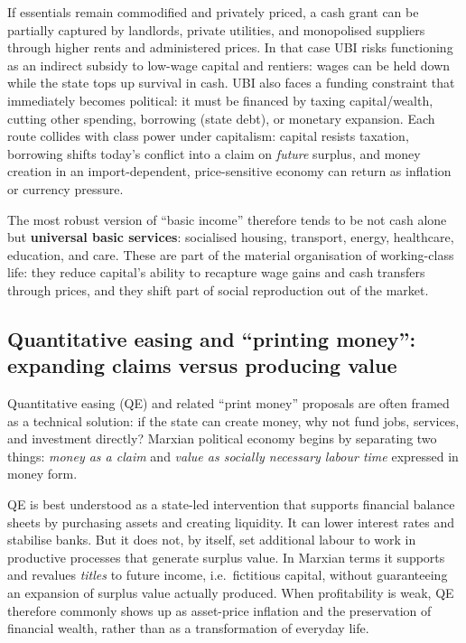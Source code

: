 If essentials remain commodified and privately priced, a cash grant can be partially captured by landlords, private
utilities, and monopolised suppliers through higher rents and administered prices. In that case UBI risks functioning
as an indirect subsidy to low-wage capital and rentiers: wages can be held down while the state tops up survival in cash.
UBI also faces a funding constraint that immediately becomes political: it must be financed by taxing capital/wealth,
cutting other spending, borrowing (state debt), or monetary expansion. Each route collides with class power under
capitalism: capital resists taxation, borrowing shifts today's conflict into a claim on \emph{future} surplus, and money
creation in an import-dependent, price-sensitive economy can return as inflation or currency pressure.

The most robust version of ``basic income'' therefore tends to be not cash alone but \textbf{universal basic services}:
socialised housing, transport, energy, healthcare, education, and care. These are part of the material organisation of working-class life: they reduce
capital's ability to recapture wage gains and cash transfers through prices, and they shift part of social reproduction
out of the market.

\subsection{Quantitative easing and ``printing money'': expanding claims versus producing value}
\label{sec:policy-qe}

Quantitative easing (QE) and related ``print money'' proposals are often framed as a technical solution: if the state can
create money, why not fund jobs, services, and investment directly? Marxian political economy begins by separating two
things: \emph{money as a claim} and \emph{value as socially necessary labour time} expressed in money form.

QE is best understood as a state-led intervention that supports financial balance sheets by purchasing assets and
creating liquidity. It can lower interest rates and stabilise banks. But it does not, by itself, set additional labour
to work in productive processes that generate surplus value. In Marxian terms it supports and revalues \emph{titles} to
future income, i.e.\ fictitious capital, without guaranteeing an expansion of surplus value actually produced. When
profitability is weak, QE therefore commonly shows up as asset-price inflation and the preservation of financial wealth,
rather than as a transformation of everyday life.

